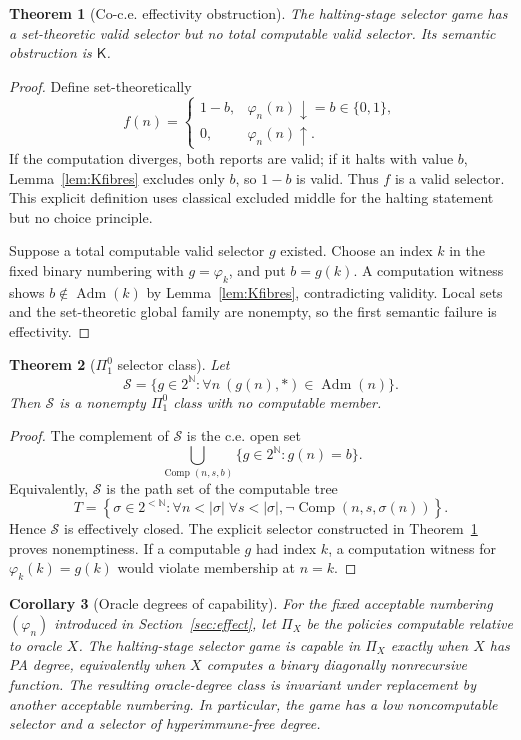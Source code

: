 \documentclass[11pt]{article}
\theoremstyle{plain}
\newtheorem{theorem}{Theorem}[section]
\newtheorem{corollary}[theorem]{Corollary}
\theoremstyle{definition}
\theoremstyle{remark}
\newcommand{\N}{\mathbb{N}}
\newcommand{\Adm}{\operatorname{Adm}}
\begin{document}
\begin{theorem}[Co-c.e. effectivity obstruction]\label{thm:Kgame}
The halting-stage selector game has a set-theoretic valid selector but no total
computable valid selector. Its semantic obstruction is $\mathsf K$.
\end{theorem}

\begin{proof}
Define set-theoretically
\[
f(n)=
\begin{cases}
1-b,&\varphi_n(n)\downarrow=b\in\{0,1\},\\
0,&\varphi_n(n)\uparrow.
\end{cases}
\]
If the computation diverges, both reports are valid; if it halts with value
$b$, Lemma~\ref{lem:Kfibres} excludes only $b$, so $1-b$ is valid. Thus $f$ is
a valid selector. This explicit definition uses classical excluded middle for
the halting statement but no choice principle.

Suppose a total computable valid selector $g$ existed. Choose an index $k$ in the
fixed binary numbering with $g=\varphi_k$, and put $b=g(k)$. A computation
witness shows $b\notin\Adm(k)$ by Lemma~\ref{lem:Kfibres}, contradicting
validity. Local sets and the set-theoretic global family are nonempty, so the
first semantic failure is effectivity.
\end{proof}

\begin{theorem}[$\Pi^0_1$ selector class]\label{thm:Pi01}
Let
\[
\mathcal S=\{g\in2^{\N}:\forall n\ (g(n),\ast)\in\Adm(n)\}.
\]
Then $\mathcal S$ is a nonempty $\Pi^0_1$ class with no computable member.
\end{theorem}

\begin{proof}
The complement of $\mathcal S$ is the c.e. open set
\[
\bigcup_{\operatorname{Comp}(n,s,b)}
\{g\in2^{\N}:g(n)=b\}.
\]
Equivalently, $\mathcal S$ is the path set of the computable tree
\[
T=\left\{\sigma\in2^{<\N}:
\forall n<|\sigma|\;\forall s<|\sigma|,
\neg\operatorname{Comp}(n,s,\sigma(n))\right\}.
\]
Hence $\mathcal S$ is effectively closed. The explicit selector constructed in
Theorem~\ref{thm:Kgame} proves nonemptiness. If a computable $g$ had index $k$,
a computation witness for $\varphi_k(k)=g(k)$ would violate membership at
$n=k$.
\end{proof}

\begin{corollary}[Oracle degrees of capability]\label{cor:PAdegree}
For the fixed acceptable numbering $(\varphi_n)$ introduced in Section~\ref{sec:effect}, let $\Pi_X$ be the policies computable relative
to oracle $X$. The halting-stage selector game is capable in $\Pi_X$ exactly
when $X$ has PA degree, equivalently when $X$ computes a binary diagonally
nonrecursive function. The resulting oracle-degree class is invariant under
replacement by another acceptable numbering. In
particular, the game has a low noncomputable selector and a selector of
hyperimmune-free degree.
\end{corollary}
\end{document}
